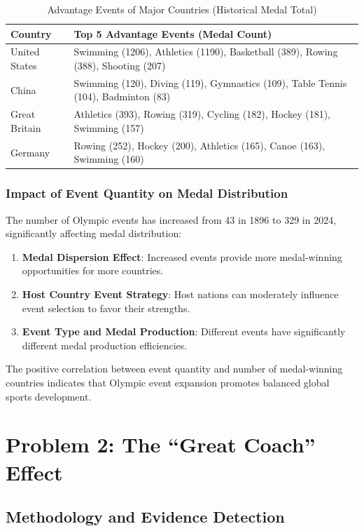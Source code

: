 \documentclass{mcmthesis}
\begin{document}
\begin{table}[htbp]
\centering
\caption{Advantage Events of Major Countries (Historical Medal Total)}
\label{tab:advantage_events}
\begin{tabular}{ll}
\toprule
\textbf{Country} & \textbf{Top 5 Advantage Events (Medal Count)} \\
\midrule
United States & Swimming (1206), Athletics (1190), Basketball (389), Rowing (388), Shooting (207) \\
China & Swimming (120), Diving (119), Gymnastics (109), Table Tennis (104), Badminton (83) \\
Great Britain & Athletics (393), Rowing (319), Cycling (182), Hockey (181), Swimming (157) \\
Germany & Rowing (252), Hockey (200), Athletics (165), Canoe (163), Swimming (160) \\
\bottomrule
\end{tabular}
\end{table}

\subsubsection{Impact of Event Quantity on Medal Distribution}

The number of Olympic events has increased from 43 in 1896 to 329 in 2024, significantly affecting medal distribution:

\begin{enumerate}
    \item \textbf{Medal Dispersion Effect}: Increased events provide more medal-winning opportunities for more countries.
    \item \textbf{Host Country Event Strategy}: Host nations can moderately influence event selection to favor their strengths.
    \item \textbf{Event Type and Medal Production}: Different events have significantly different medal production efficiencies.
\end{enumerate}

The positive correlation between event quantity and number of medal-winning countries indicates that Olympic event expansion promotes balanced global sports development.

\section{Problem 2: The ``Great Coach'' Effect}

\subsection{Methodology and Evidence Detection}
\end{document}
